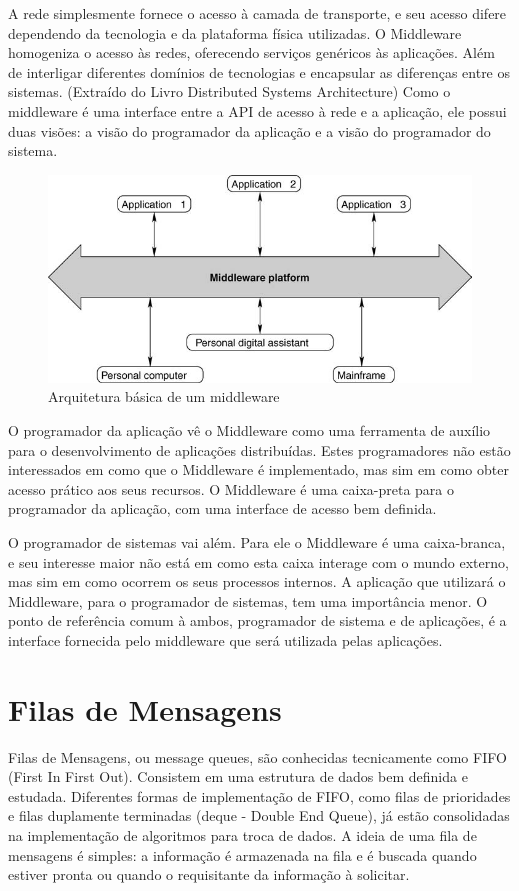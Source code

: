 \documentclass[12pt]{article}
\begin{document}
	A rede simplesmente fornece o acesso à camada de transporte, e seu acesso difere
dependendo da tecnologia e da plataforma física utilizadas. O Middleware homogeniza o
acesso às redes, oferecendo serviços genéricos às aplicações. Além de interligar
diferentes domínios de tecnologias e encapsular as diferenças entre os sistemas. (Extraído do Livro Distributed Systems Architecture)
Como o middleware é uma interface entre a API de acesso à rede e a aplicação, ele possui duas visões: a visão do programador da aplicação e a visão do programador do sistema.

\begin{figure}[ht]
\centering
	\includegraphics[width=.5\textwidth]{Img_Middleware_Arc.png}
\caption{Arquitetura básica de um middleware}
\label{fig:fig_middleware}
\end{figure}

	O programador da aplicação vê o Middleware como uma ferramenta de auxílio para o
desenvolvimento de aplicações distribuídas. Estes programadores não estão interessados
em como que o Middleware é implementado, mas sim em como obter acesso prático aos seus recursos. O Middleware é uma caixa-preta para o programador da aplicação, com uma interface de acesso bem definida.

	O programador de sistemas vai além. Para ele o Middleware é uma caixa-branca, e seu
interesse maior não está em como esta caixa interage com o mundo externo, mas sim em
como ocorrem os seus processos internos. A aplicação que utilizará o Middleware, para o programador de sistemas, tem uma importância menor. O ponto de referência comum à ambos, programador de sistema e de aplicações, é a interface fornecida pelo middleware que será utilizada pelas aplicações.

\section{Filas de Mensagens}
	Filas de Mensagens, ou message queues, são conhecidas tecnicamente como FIFO (First In First Out). Consistem em uma estrutura de dados bem definida e estudada. Diferentes formas de implementação de FIFO, como filas de prioridades e filas duplamente terminadas (deque - Double End Queue), já estão consolidadas na implementação
de algoritmos para troca de dados. A ideia de uma fila de mensagens é simples: a informação é armazenada na fila e é buscada quando estiver pronta ou quando o requisitante da informação à solicitar.
\end{document}

